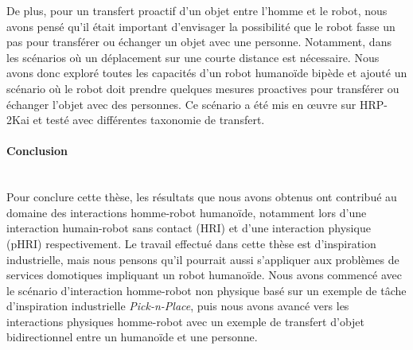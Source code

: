 
De plus, pour un transfert proactif d'un objet entre l'homme et le robot, nous avons pensé qu'il était important d'envisager la possibilité que le robot fasse un pas pour transférer ou échanger un objet avec une personne. Notamment, dans les scénarios où un déplacement sur une courte distance est nécessaire. Nous avons donc exploré toutes les capacités d'un robot humanoïde bipède et ajouté un scénario où le robot doit prendre quelques mesures proactives pour transférer ou échanger l'objet avec des personnes. Ce scénario a été mis en œuvre sur HRP-2Kai et testé avec différentes taxonomie de transfert.




\paragraph*{\LARGE {Conclusion \\}\\}


Pour conclure cette thèse, les résultats que nous avons obtenus ont contribué au domaine des interactions homme-robot humanoïde, notamment lors d'une interaction humain-robot sans contact (HRI) et d'une interaction physique (pHRI) respectivement. Le travail effectué dans cette thèse est d'inspiration industrielle, mais nous pensons qu'il pourrait aussi s'appliquer aux problèmes de services domotiques impliquant un robot humanoïde. Nous avons commencé avec le scénario d'interaction homme-robot non physique basé sur un exemple de tâche d'inspiration industrielle \textit{Pick-n-Place}, puis nous avons avancé vers les interactions physiques homme-robot avec un exemple de transfert d'objet bidirectionnel entre un humanoïde et une personne.


